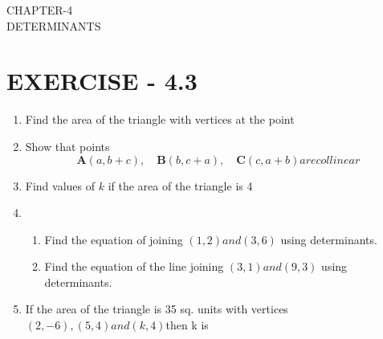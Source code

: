 \documentclass[12pt]{article}
\begin{document}
\begin{center}
\textbf\large{CHAPTER-4 \\ DETERMINANTS}
\end{center}

\section*{EXERCISE - 4.3}
\begin{enumerate}
    \item Find the area of the triangle with vertices at the point
    \begin{enumerate}[label=(\roman*)]
    \end{enumerate}
    \item Show that points  \[\mathbf{A} (a, b + c), \quad \mathbf{B} (b, c + a), \quad \mathbf{C} (c, a + b) are collinear\]

    \item Find values of \( k \) if the area of the triangle is 4 

    \begin{enumerate}[label=(\roman*)]
    \end{enumerate}

    \item
    \begin{enumerate}[label=(\roman*)]
        \item Find the equation of joining \( (1,2)  and (3,6) \) using determinants.
        \item Find the equation of the line joining \( (3,1)  and (9,3) \) using determinants.
    \end{enumerate}

    \item If the area of the triangle is 35 sq. units with vertices \( (2, -6), (5, 4) and (k, 4) \)then k is

    \begin{enumerate}[label=(\Alph*)]
    \end{enumerate}

\end{enumerate}
\end{document}
